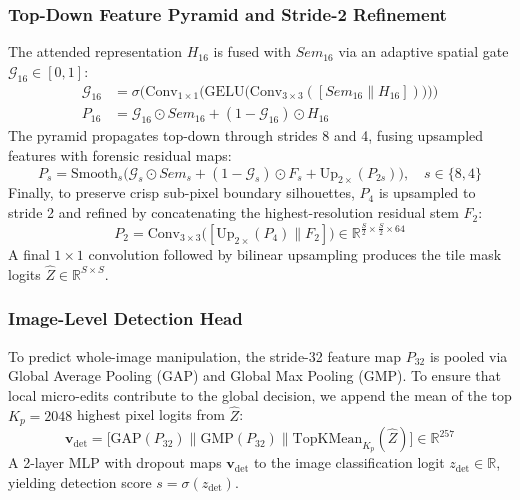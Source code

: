 \subsubsection{Top-Down Feature Pyramid and Stride-2 Refinement}
The attended representation $H_{16}$ is fused with $Sem_{16}$ via an adaptive spatial gate $\mathcal{G}_{16} \in [0, 1]$:
\begin{align}
    \mathcal{G}_{16} &= \sigma\Big(\mathrm{Conv}_{1 \times 1}\big(\mathrm{GELU}\big(\mathrm{Conv}_{3 \times 3}([Sem_{16} \parallel H_{16}])\big)\big)\Big) \\
    P_{16} &= \mathcal{G}_{16} \odot Sem_{16} + (1 - \mathcal{G}_{16}) \odot H_{16}
\end{align}
The pyramid propagates top-down through strides 8 and 4, fusing upsampled features with forensic residual maps:
\begin{equation}
    P_s = \mathrm{Smooth}_s\Big(\mathcal{G}_s \odot Sem_s + (1 - \mathcal{G}_s) \odot F_s + \mathrm{Up}_{2\times}(P_{2s})\Big), \quad s \in \{8, 4\}
\end{equation}
Finally, to preserve crisp sub-pixel boundary silhouettes, $P_4$ is upsampled to stride 2 and refined by concatenating the highest-resolution residual stem $F_2$:
\begin{equation}
    P_2 = \mathrm{Conv}_{3 \times 3}\big([\mathrm{Up}_{2\times}(P_4) \parallel F_2]\big) \in \mathbb{R}^{\frac{S}{2} \times \frac{S}{2} \times 64}
\end{equation}
A final $1 \times 1$ convolution followed by bilinear upsampling produces the tile mask logits $\hat{Z} \in \mathbb{R}^{S \times S}$.

\subsubsection{Image-Level Detection Head}
To predict whole-image manipulation, the stride-32 feature map $P_{32}$ is pooled via Global Average Pooling (GAP) and Global Max Pooling (GMP). To ensure that local micro-edits contribute to the global decision, we append the mean of the top $K_p = 2048$ highest pixel logits from $\hat{Z}$:
\begin{equation}
    \mathbf{v}_{\mathrm{det}} = \big[\mathrm{GAP}(P_{32}) \parallel \mathrm{GMP}(P_{32}) \parallel \mathrm{TopKMean}_{K_p}(\hat{Z})\big] \in \mathbb{R}^{257}
\end{equation}
A 2-layer MLP with dropout maps $\mathbf{v}_{\mathrm{det}}$ to the image classification logit $z_{\mathrm{det}} \in \mathbb{R}$, yielding detection score $s = \sigma(z_{\mathrm{det}})$.

